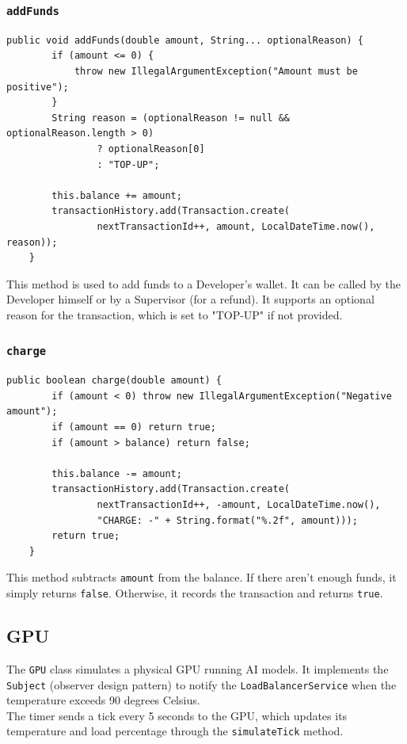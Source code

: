 \documentclass[a4paper,11pt]{report}
\begin{document}
	\subsubsection{\texttt{addFunds}}
	\begin{lstlisting}[label={lst:walletaddfunds}]
	public void addFunds(double amount, String... optionalReason) {
		if (amount <= 0) {
			throw new IllegalArgumentException("Amount must be positive");
		}
		String reason = (optionalReason != null && optionalReason.length > 0)
				? optionalReason[0]
				: "TOP-UP";
	
		this.balance += amount;
		transactionHistory.add(Transaction.create(
				nextTransactionId++, amount, LocalDateTime.now(), reason));
	}
	\end{lstlisting}
	This method is used to add funds to a Developer's wallet. It can be called by the Developer himself or by a Supervisor (for a refund). It supports an optional reason for the transaction, which is set to "TOP-UP" if not provided.
	\clearpage
	
	\subsubsection{\texttt{charge}}
	\begin{lstlisting}[label={lst:walletcharge}]
	public boolean charge(double amount) {
		if (amount < 0) throw new IllegalArgumentException("Negative amount");
		if (amount == 0) return true;
		if (amount > balance) return false;
	
		this.balance -= amount;
		transactionHistory.add(Transaction.create(
				nextTransactionId++, -amount, LocalDateTime.now(),
				"CHARGE: -" + String.format("%.2f", amount)));
		return true;
	}
	\end{lstlisting}
	This method subtracts \texttt{amount} from the balance. If there aren't enough funds, it simply returns \texttt{false}. Otherwise, it records the transaction and returns \texttt{true}.
	
	
	\subsection{GPU}
	The \texttt{GPU} class simulates a physical GPU running AI models. It implements the \texttt{Subject} (observer design pattern) to notify the \texttt{LoadBalancerService} when the temperature exceeds 90 degrees Celsius. 
	\\The timer sends a tick every 5 seconds to the GPU, which updates its temperature and load percentage through the \texttt{simulateTick} method.
	
\end{document}
